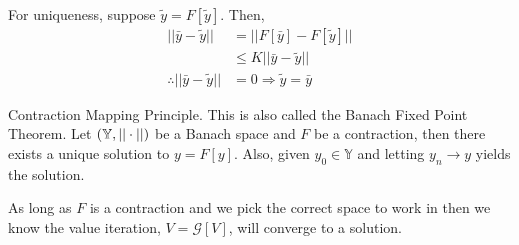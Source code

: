 \documentclass[lecture,12pt,]{pcms-l}
\begin{document}
For uniqueness, suppose $\tilde{y}=F[\tilde{y}]$. Then,
\begin{align*}
||\bar{y}-\tilde{y}|| &= ||F[\bar{y}]-F[\tilde{y}]|| \\
&\leq K||\bar{y}-\tilde{y}|| \\
\therefore ||\bar{y}-\tilde{y}|| &= 0 \Rightarrow \tilde{y} = \bar{y}
\end{align*}

\begin{theorem}{Contraction Mapping Principle.}
This is also called the Banach Fixed Point Theorem. Let $(\mathbb{Y},||\cdot||)$ be a Banach space and $F$ be a contraction, then there exists a unique solution to $y=F[y]$. Also, given $y_0\in\mathbb{Y}$ and letting $y_n\to y$ yields the solution.
\end{theorem}

As long as $F$ is a contraction and we pick the correct space to work in then we know the value iteration, $V=\mathcal{G}[V]$, will converge to a solution.
\end{document}
